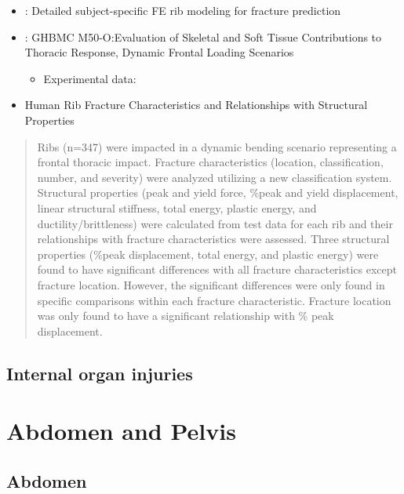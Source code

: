 \documentclass[]{book}
\providecommand{\tightlist}{%
  \setlength{\itemsep}{0pt}\setlength{\parskip}{0pt}}
\begin{document}
\begin{itemize}
\item
  \citet{Iraeus2019}: Detailed subject-specific FE rib modeling for fracture prediction
\item
  \citet{Ramachandra2019}: GHBMC M50-O:Evaluation of Skeletal and Soft Tissue Contributions to Thoracic Response, Dynamic Frontal Loading Scenarios

  \begin{itemize}
  \tightlist
  \item
    Experimental data: \citep{Murach2018}
  \end{itemize}
\item
  Human Rib Fracture Characteristics and Relationships with Structural Properties \citep{Harden2019}
\end{itemize}

\begin{quote}
Ribs (n=347) were impacted in a dynamic bending scenario representing a frontal thoracic impact. Fracture characteristics (location, classification, number, and severity) were analyzed utilizing a new classification system.
Structural properties (peak and yield force, \%peak and yield displacement, linear structural stiffness, total energy, plastic energy, and ductility/brittleness) were calculated from test data for each rib and their relationships with fracture characteristics were assessed. Three structural properties (\%peak displacement, total energy, and plastic energy) were found to have significant differences with all fracture characteristics except fracture location. However, the significant differences were only found in specific comparisons within each fracture characteristic. Fracture location was only found to have a significant relationship with \% peak displacement.
\end{quote}

\hypertarget{internal-organ-injuries}{%
\section{Internal organ injuries}\label{internal-organ-injuries}}

\hypertarget{abdomen-and-pelvis}{%
\chapter{Abdomen and Pelvis}\label{abdomen-and-pelvis}}

\hypertarget{abdomen}{%
\section{Abdomen}\label{abdomen}}
\end{document}
